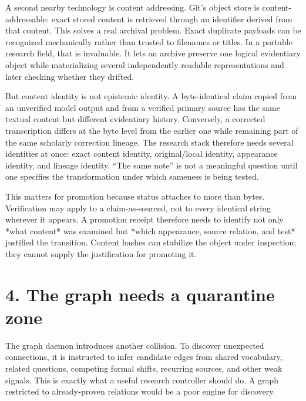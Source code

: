 \documentclass[11pt]{article}
\begin{document}
A second nearby technology is content addressing. Git’s object store is content-addressable: exact stored content is retrieved through an identifier derived from that content. This solves a real archival problem. Exact duplicate payloads can be recognized mechanically rather than trusted to filenames or titles. In a portable research field, that is invaluable. It lets an archive preserve one logical evidentiary object while materializing several independently readable representations and later checking whether they drifted.



But content identity is not epistemic identity. A byte-identical claim copied from an unverified model output and from a verified primary source has the same textual content but different evidentiary history. Conversely, a corrected transcription differs at the byte level from the earlier one while remaining part of the same scholarly correction lineage. The research stack therefore needs several identities at once: exact content identity, original/local identity, appearance identity, and lineage identity. “The same note” is not a meaningful question until one specifies the transformation under which sameness is being tested.



This matters for promotion because status attaches to more than bytes. Verification may apply to a claim-as-sourced, not to every identical string wherever it appears. A promotion receipt therefore needs to identify not only *what content* was examined but *which appearance, source relation, and test* justified the transition. Content hashes can stabilize the object under inspection; they cannot supply the justification for promoting it.



\section*{4. The graph needs a quarantine zone}



The graph daemon introduces another collision. To discover unexpected connections, it is instructed to infer candidate edges from shared vocabulary, related questions, competing formal shifts, recurring sources, and other weak signals. This is exactly what a useful research controller should do. A graph restricted to already-proven relations would be a poor engine for discovery.
\end{document}
